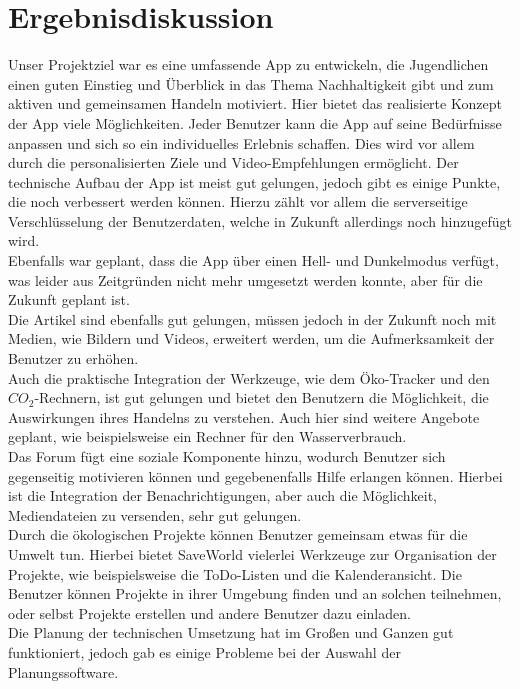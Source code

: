 \documentclass[../main.tex]{subfiles}
\begin{document}
    \chapter{Ergebnisdiskussion}
    Unser Projektziel war es eine umfassende App zu entwickeln, die Jugendlichen einen guten Einstieg und Überblick in das Thema Nachhaltigkeit gibt und zum aktiven und gemeinsamen Handeln motiviert.
    Hier bietet das realisierte Konzept der App viele Möglichkeiten.
    Jeder Benutzer kann die App auf seine Bedürfnisse anpassen und sich so ein individuelles Erlebnis schaffen.
    Dies wird vor allem durch die personalisierten Ziele und Video-Empfehlungen ermöglicht.
    Der technische Aufbau der App ist meist gut gelungen, jedoch gibt es einige Punkte, die noch verbessert werden können.
    Hierzu zählt vor allem die serverseitige Verschlüsselung der Benutzerdaten, welche in Zukunft allerdings noch hinzugefügt wird.
    \\
    Ebenfalls war geplant, dass die App über einen Hell- und Dunkelmodus verfügt, was leider aus Zeitgründen nicht mehr umgesetzt werden konnte, aber für die Zukunft geplant ist.
    \\
    Die Artikel sind ebenfalls gut gelungen, müssen jedoch in der Zukunft noch mit Medien, wie Bildern und Videos, erweitert werden, um die Aufmerksamkeit der Benutzer zu erhöhen.
    \\
    Auch die praktische Integration der Werkzeuge, wie dem Öko-Tracker und den $CO_2$-Rechnern, ist gut gelungen und bietet den Benutzern die Möglichkeit, die Auswirkungen ihres Handelns zu verstehen.
    Auch hier sind weitere Angebote geplant, wie beispielsweise ein Rechner für den Wasserverbrauch.
    \\
    Das Forum fügt eine soziale Komponente hinzu, wodurch Benutzer sich gegenseitig motivieren können und gegebenenfalls Hilfe erlangen können.
    Hierbei ist die Integration der Benachrichtigungen, aber auch die Möglichkeit, Mediendateien zu versenden, sehr gut gelungen.
    \\
    Durch die ökologischen Projekte können Benutzer gemeinsam etwas für die Umwelt tun.
    Hierbei bietet SaveWorld vielerlei Werkzeuge zur Organisation der Projekte, wie beispielsweise die ToDo-Listen und die Kalenderansicht.
    Die Benutzer können Projekte in ihrer Umgebung finden und an solchen teilnehmen, oder selbst Projekte erstellen und andere Benutzer dazu einladen.
    \\
    Die Planung der technischen Umsetzung hat im Großen und Ganzen gut funktioniert, jedoch gab es einige Probleme bei der Auswahl der Planungssoftware.
\end{document}

